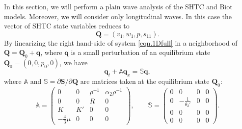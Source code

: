 \documentclass[3p,times,table]{article}
\newcommand{\pd}{\partial}
\newcommand{\QQ}{{\bm{Q}}}
\renewcommand{\SS}{{\bm{S}}}
\newcommand{\qq}{{\bm{q}}}
\begin{document}
In this section, we will perform a plain wave analysis of the SHTC and Biot 
models. Moreover, we will 
consider only longitudinal waves. In this case the vector of SHTC state 
variables reduces to 
\begin{equation}
\QQ = (v_1,w_1,p,s_{11}).
\end{equation}
By linearizing the right hand-side of system \eqref{eqn.1Dfull} in a 
neighborhood of $ \QQ = \QQ_0 + \qq $, where $ \qq 
$ is a small perturbation of an equilibrium state $ \QQ_0 = (0,0,p_0,0) $, we have
\begin{equation}\label{eqn.perturb}
\qq_t + \mathbb{A}\qq_x = \mathbb{S}\qq,
\end{equation}
where $ \mathbb{A} $ and $ \mathbb{S} = \pd\SS/\pd\QQ $ are matrices taken 
at the equilibrium state $ \QQ_0 $:
\begin{equation}\label{eqn.1d.matrices}
\mathbb{A} = \left( \begin{array}{cccc}
0 & 0 & \rho^{-1} & \alpha_{2}\rho^{-1} \\ 
0 & 0 & R & 0 \\ 
K & K' & 0 & 0 \\ 
-\frac43\mu & 0 & 0 & 0
\end{array} \right), \qquad
\mathbb{S} = \left( \begin{array}{cccc}
0 & 0 & 0 & 0 \\ 
0 & -\frac{1}{\theta_2'} & 0 & 0 \\ 
0 & 0 & 0 & 0 \\ 
0 & 0 & 0 & 0
\end{array} \right).
\end{equation}
\end{document}
